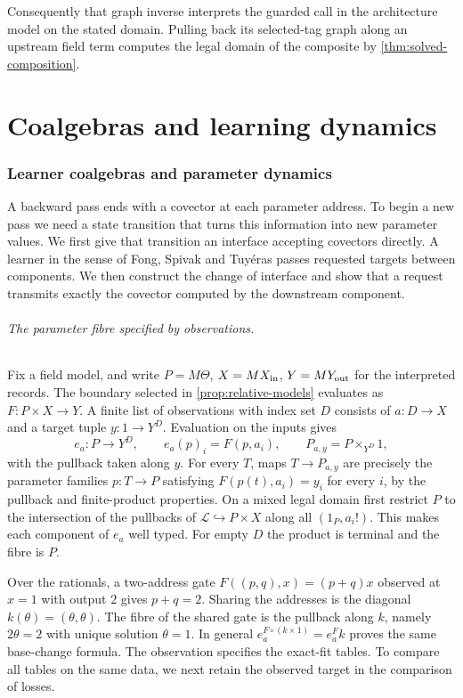 \documentclass[11pt,a4paper]{article}
\theoremstyle{definition}
\theoremstyle{remark}\newaliascnt{remark}{theorem}
\numberwithin{equation}{section}
\begin{document}
Consequently that graph inverse interprets the guarded call in the architecture model on the stated domain. Pulling back its selected-tag graph along an upstream field term computes the legal domain of the composite by \cref{thm:solved-composition}.

\clearpage
\part{Coalgebras and learning dynamics}\label{part:learners}

\section{Learner coalgebras and parameter dynamics}\label{sec:learning}
A backward pass ends with a covector at each parameter address. To begin a new pass we need a state transition that turns this information into new parameter values. We first give that transition an interface accepting covectors directly. A learner in the sense of Fong, Spivak and Tuy\'eras passes requested targets between components. We then construct the change of interface and show that a request transmits exactly the covector computed by the downstream component.

\paragraph{The parameter fibre specified by observations.}\label{sec:fit-fibre}
Fix a field model, and write \(P=M\Theta\), \(X=MX_{\rm in}\), \(Y=MY_{\rm out}\) for the interpreted records. The boundary selected in \cref{prop:relative-models} evaluates as \(F:P\times X\to Y\). A finite list of observations with index set \(D\) consists of \(a:D\to X\) and a target tuple \(y:1\to Y^D\). Evaluation on the inputs gives
\[
 e_a:P\longrightarrow Y^D,\qquad e_a(p)_i=F(p,a_i),
 \qquad P_{a,y}=P\times_{Y^D}1 ,
\]
with the pullback taken along \(y\). For every \(T\), maps \(T\to P_{a,y}\) are precisely the parameter families \(p:T\to P\) satisfying \(F(p(t),a_i)=y_i\) for every \(i\), by the pullback and finite-product properties. On a mixed legal domain first restrict \(P\) to the intersection of the pullbacks of \(\mathcal L\hookrightarrow P\times X\) along all \((1_P,a_i!)\). This makes each component of \(e_a\) well typed. For empty \(D\) the product is terminal and the fibre is \(P\).

Over the rationals, a two-address gate \(F((p,q),x)=(p+q)x\) observed at \(x=1\) with output \(2\) gives \(p+q=2\). Sharing the addresses is the diagonal \(k(\theta)=(\theta,\theta)\). The fibre of the shared gate is the pullback along \(k\), namely \(2\theta=2\) with unique solution \(\theta=1\). In general \(e_a^{F\circ(k\times1)}=e_a^F k\) proves the same base-change formula. The observation specifies the exact-fit tables. To compare all tables on the same data, we next retain the observed target in the comparison of losses.
\end{document}
